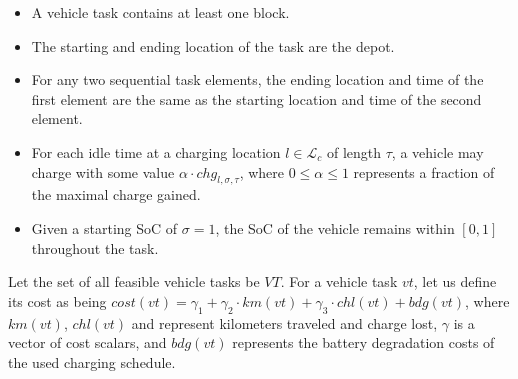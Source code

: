 \documentclass[]{article}
\begin{document}
\begin{itemize}
  \item A vehicle task contains at least one block. 
  \item The starting and ending location of the task are the depot. 
  \item For any two sequential task elements, the ending location and time of the first element are the same as the starting location and time of the second element.
  \item For each idle time at a charging location $l \in \mathcal{L}_c$ of length $\tau$, a vehicle may charge with some value $\alpha \cdot chg_{l,\sigma,\tau}$, where $0 \leq \alpha \leq 1$ represents a fraction of the maximal charge gained. 
  \item Given a starting SoC of $\sigma=1$, the SoC of the vehicle remains within $[0, 1]$ throughout the task.
\end{itemize}
Let the set of all feasible vehicle tasks be $VT$. For a vehicle task $vt$, let us define its cost as being $cost(vt) = \gamma_1 + \gamma_2 \cdot km(vt) + \gamma_3 \cdot chl(vt) + bdg(vt)$, where $km(vt)$, $chl(vt)$ and represent kilometers traveled and charge lost, $\gamma$ is a vector of cost scalars, and $bdg(vt)$ represents the battery degradation costs of the used charging schedule.
\end{document}
